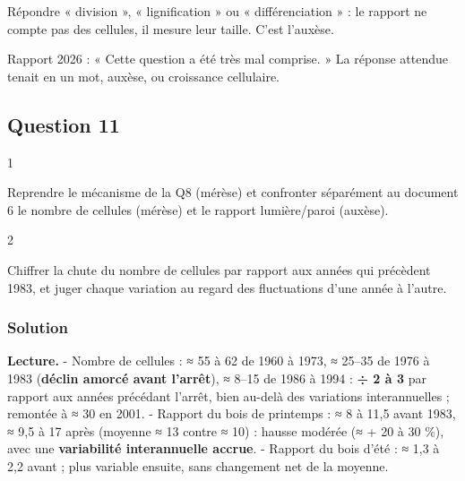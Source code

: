 \documentclass[11pt,a4paper]{article}
\begin{document}
\begin{piege}

Répondre « division », « lignification » ou « différenciation » : le rapport ne compte pas des cellules, il mesure leur taille. C'est l'auxèse.

\end{piege}

\begin{jury}

Rapport 2026 : « Cette question a été très mal comprise. » La réponse attendue tenait en un mot, auxèse, ou croissance cellulaire.

\end{jury}

\hypertarget{question-11}{%
\subsection{Question 11}\label{question-11}}

\begin{indication}{1}

Reprendre le mécanisme de la Q8 (mérèse) et confronter séparément au document 6 le nombre de cellules (mérèse) et le rapport lumière/paroi (auxèse).

\end{indication}

\begin{indication}{2}

Chiffrer la chute du nombre de cellules par rapport aux années qui précèdent 1983, et juger chaque variation au regard des fluctuations d'une année à l'autre.

\end{indication}

\hypertarget{solution-10}{%
\subsubsection{Solution}\label{solution-10}}

\textbf{Lecture.}
- Nombre de cellules : ≈ 55 à 62 de 1960 à 1973, ≈ 25--35 de 1976 à 1983 (\textbf{déclin amorcé avant l'arrêt}), ≈ 8--15 de 1986 à 1994 : \textbf{÷ 2 à 3} par rapport aux années précédant l'arrêt, bien au-delà des variations interannuelles ; remontée à ≈ 30 en 2001.
- Rapport du bois de printemps : ≈ 8 à 11,5 avant 1983, ≈ 9,5 à 17 après (moyenne ≈ 13 contre ≈ 10) : hausse modérée (≈ + 20 à 30 \%), avec une \textbf{variabilité interannuelle accrue}.
- Rapport du bois d'été : ≈ 1,3 à 2,2 avant ; plus variable ensuite, sans changement net de la moyenne.
\end{document}
